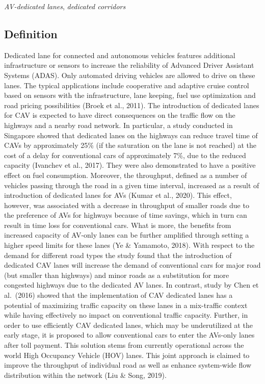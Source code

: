 \documentclass[
]{book}
\begin{document}
\emph{AV-dedicated lanes}, \emph{dedicated corridors}

\hypertarget{definition}{%
\subsection*{Definition}\label{definition}}

Dedicated lane for connected and autonomous vehicles features additional infrastructure or sensors to increase the reliability of Advanced Driver Assistant Systems (ADAS). Only automated driving vehicles are allowed to drive on these lanes. The typical applications include cooperative and adaptive cruise control based on sensors with the infrastructure, lane keeping, fuel use optimization and road pricing possibilities (Broek et al., 2011). The introduction of dedicated lanes for CAV is expected to have direct consequences on the traffic flow on the highways and a nearby road network. In particular, a study conducted in Singapore showed that dedicated lanes on the highways can reduce travel time of CAVs by approximately 25\% (if the saturation on the lane is not reached) at the cost of a delay for conventional cars of approximately 7\%, due to the reduced capacity (Ivanchev et al., 2017). They were also demonstrated to have a positive effect on fuel consumption.
Moreover, the throughput, defined as a number of vehicles passing through the road in a given time interval, increased as a result of introduction of dedicated lanes for AVs (Kumar et al., 2020). This effect, however, was associated with a decrease in throughput of smaller roads due to the preference of AVs for highways because of time savings, which in turn can result in time loss for conventional cars. What is more, the benefits from increased capacity of AV-only lanes can be further amplified through setting a higher speed limits for these lanes (Ye \& Yamamoto, 2018). With respect to the demand for different road types the study found that the introduction of dedicated CAV lanes will increase the demand of conventional cars for major road (but smaller than highways) and minor roads as a substitution for more congested highways due to the dedicated AV lanes.
In contrast, study by Chen et al.~(2016) showed that the implementation of CAV dedicated lanes has a potential of maximizing traffic capacity on these lanes in a mix-traffic context while having effectively no impact on conventional traffic capacity. Further, in order to use efficiently CAV dedicated lanes, which may be underutilized at the early stage, it is proposed to allow conventional cars to enter the AVs-only lanes after toll payment. This solution stems from currently operational across the world High Occupancy Vehicle (HOV) lanes. This joint approach is claimed to improve the throughput of individual road as well as enhance system-wide flow distribution within the network (Liu \& Song, 2019).
\end{document}
